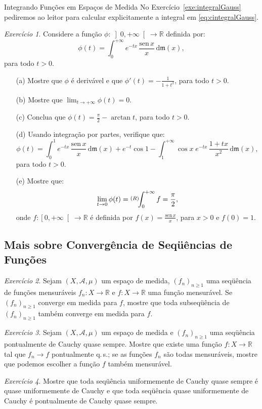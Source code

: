 \documentclass[oneside,final,11pt]{amsbook}
\newcommand{\R}{\mathds R}
\newcommand{\leb}{\mathfrak m}
\newcommand{\dd}{\mathrm d}
\newcommand{\qs}{\hbox{q.$\,$s.}}
\newcommand{\sen}{\mathrm{sen}}
\newcommand{\intRd}{\raise2pt\hbox{$\scriptstyle(R)$}\!\!\int}
\theoremstyle{remark}\newtheorem{exercise}{Exercício}[chapter]
\theoremstyle{remark}\newtheorem{*exercise}[exercise]{\hbox to 0pt{\hskip 0pt minus 1fil*}Exercício}
\theoremstyle{definition}\newtheorem{exdefin}{Definição}[chapter]
\theoremstyle{plain}\newtheorem{teo}{Teorema}[section]
\theoremstyle{plain}\newtheorem{lem}[teo]{Lema}
\theoremstyle{plain}\newtheorem{prop}[teo]{Proposição}
\theoremstyle{plain}\newtheorem{cor}[teo]{Corolário}
\theoremstyle{definition}\newtheorem{defin}[teo]{Definição}
\theoremstyle{remark}\newtheorem{rem}[teo]{Observação}
\theoremstyle{definition}\newtheorem{notation}[teo]{Notação}
\theoremstyle{definition}\newtheorem{convention}[teo]{Convenção}
\theoremstyle{definition}\newtheorem{example}[teo]{Exemplo}
\numberwithin{section}{chapter}
\numberwithin{equation}{section}
\begin{document}
\begin{chapter}{Integrando Funções em Espaços de Medida}
No Exercício~\ref{exe:integralGauss} pediremos ao leitor para calcular explicitamente a integral
em \eqref{eq:cintegralGauss}.

\begin{exercise}\label{exe:senxx}
Considere a função $\phi:\left]0,+\infty\right[\to\R$ definida por:
\[\phi(t)=\int_0^{+\infty}e^{-tx}\,\frac{\sen\,x}x\,\dd\leb(x),\]
para todo $t>0$.
\begin{itemize}
\item[(a)] Mostre que $\phi$ é derivável e que $\phi'(t)=-\frac1{1+t^2}$, para todo $t>0$.
\item[(b)] Mostre que $\lim_{t\to+\infty}\phi(t)=0$.
\item[(c)] Conclua que $\phi(t)=\frac\pi2-\arctan t$, para todo $t>0$.
\item[(d)] Usando integração por partes, verifique que:
\[\phi(t)=\int_0^1e^{-tx}\,\frac{\sen\,x}x\,\dd\leb(x)+
e^{-t}\cos1-\int_1^{+\infty}\cos x\;e^{-tx}\,\frac{1+tx}{x^2}\,\dd\leb(x),\]
para todo $t>0$.
\item[(e)] Mostre que:
\[\lim_{t\to0}\phi(t)=\intRd_0^{+\infty}f=\frac\pi2,\]
onde $f:\left[0,+\infty\right[\to\R$ é definida por $f(x)=\frac{\sen\,x}x$, para $x>0$
e $f(0)=1$.
\end{itemize}
\end{exercise}

\subsection*{Mais sobre Convergência de Seqüências de Funções}

\begin{exercise}
Sejam $(X,\mathcal A,\mu)$ um espaço de medida, $(f_n)_{n\ge1}$ uma seqüência de funções mensuráveis $f_n:X\to\R$
e $f:X\to\R$ uma função mensurável. Se $(f_n)_{n\ge1}$ converge em medida para $f$, mostre que toda subseqüência
de $(f_n)_{n\ge1}$ também converge em medida para $f$.
\end{exercise}

\begin{exercise}\label{exe:Cauchy1}
Sejam $(X,\mathcal A,\mu)$ um espaço de medida e $(f_n)_{n\ge1}$ uma seqüência pontualmente de Cauchy quase sempre.
Mostre que existe uma função $f:X\to\R$ tal que $f_n\to f$ pontualmente \qs; se as funções $f_n$ são todas mensuráveis, mostre
que podemos escolher a função $f$ também mensurável.
\end{exercise}

\begin{exercise}\label{exe:Cauchy2}
Mostre que toda seqüência uniformemente de Cauchy quase sempre é quase uniformemente de Cauchy e que toda
seqüência quase uniformemente de Cauchy é pontualmente de Cauchy quase sempre.
\end{exercise}


\end{chapter}
\end{document}
